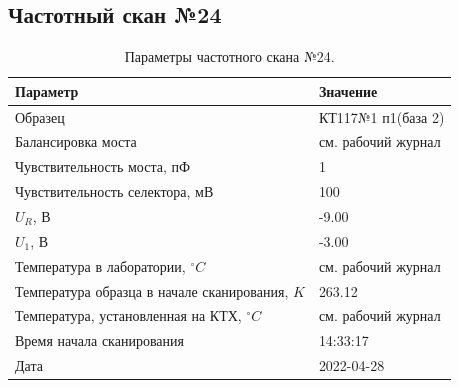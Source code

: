 \subsection{Частотный скан №24}
\begin{table}[!ht]
    \centering
    \caption{Параметры частотного скана №24.}
    \begin{tabular}{|l|l|}
        \hline
        Параметр                                       & Значение                  \\ \hline
        Образец                                        & КТ117№1 п1(база 2)        \\ \hline
        Балансировка моста                             & см. рабочий журнал        \\ \hline
        Чувствительность моста, пФ                     & 1                         \\ \hline
        Чувствительность селектора, мВ                 & 100                       \\ \hline
        $U_R$, В                                       & -9.00                     \\ \hline
        $U_1$, В                                       & -3.00                     \\ \hline
        Температура в лаборатории, $^\circ C$          & см. рабочий журнал        \\ \hline
        Температура образца в начале сканирования, $K$ & 263.12                    \\ \hline
        Температура, установленная на КТХ, $^\circ C$  & см. рабочий журнал        \\ \hline
        Время начала сканирования                      & 14:33:17                  \\ \hline
        Дата                                           & 2022-04-28                \\ \hline
    \end{tabular}
    \label{table:frequency_scan_24}
\end{table}

